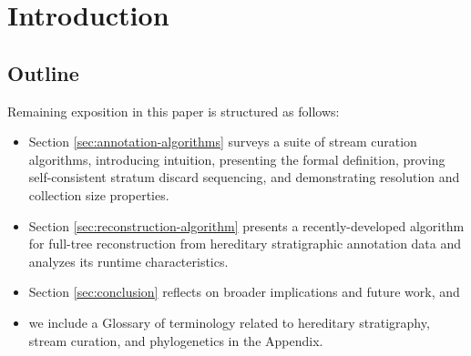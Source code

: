 \section{Introduction} \label{sec:introduction}





\subsection{Outline}

Remaining exposition in this paper is structured as follows:
\begin{itemize}
\item Section \ref{sec:annotation-algorithms} surveys a suite of stream curation algorithms, introducing intuition, presenting the formal definition, proving self-consistent stratum discard sequencing, and demonstrating resolution and collection size properties.
\item Section \ref{sec:reconstruction-algorithm} presents a recently-developed algorithm for full-tree reconstruction from hereditary stratigraphic annotation data and analyzes its runtime characteristics.
\item Section \ref{sec:conclusion} reflects on broader implications and future work, and
\item we include a Glossary of terminology related to hereditary stratigraphy, stream curation, and phylogenetics in the Appendix.
\end{itemize}
